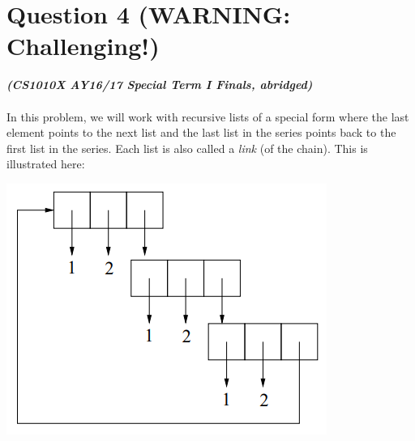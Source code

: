 \section{Question 4 (WARNING: Challenging!)}
\textbf{\textit{(CS1010X AY16/17 Special Term I Finals, abridged)}} \\ \\
In this problem, we will work with recursive lists of a special form where the last element points
to the next list and the last list in the series points back to the first list in the series. Each list is
also called a \textit{link} (of the chain). This is illustrated here:
\begin{center}
\includegraphics[scale=0.9]{chain.png}
\end{center}
